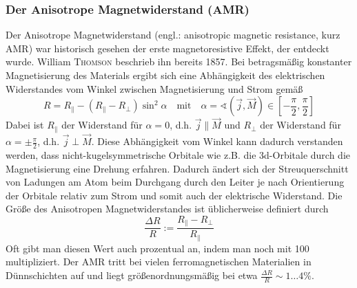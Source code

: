 \documentclass[german,  %
parskip=full,  %
]{scrartcl}
\begin{document}
\subsubsection{Der Anisotrope Magnetwiderstand (AMR)}
Der Anisotrope Magnetwiderstand (engl.: anisotropic magnetic resistance, kurz AMR) war historisch gesehen der erste magnetoresistive Effekt, der entdeckt wurde. William \textsc{Thomson} beschrieb ihn bereits 1857. Bei betragsmäßig konstanter Magnetisierung des Materials ergibt sich eine Abhängigkeit des elektrischen Widerstandes vom Winkel zwischen Magnetisierung und Strom gemäß
\[R = R_{\parallel} - (R_{\parallel} - R_{\perp})\sin^2\alpha\quad\text{mit}\quad \alpha = \sphericalangle (\vec{j},\vec{M})\in\left[-\frac{\pi}{2},\frac{\pi}{2}\right]\]
Dabei ist \(R_{\parallel}\) der Widerstand für \(\alpha=0\), d.h. \(\vec{j}\parallel\vec{M}\) und \(R_{\perp}\) der Widerstand für \(\alpha=\pm\frac{\pi}{2}\), d.h. \(\vec{j}\perp\vec{M}\).
Diese Abhängigkeit vom Winkel kann dadurch verstanden werden, dass nicht-kugelsymmetrische Orbitale wie z.B. die 3d-Orbitale durch die Magnetisierung eine Drehung erfahren. Dadurch ändert sich der Streuquerschnitt von Ladungen am Atom beim Durchgang durch den Leiter je nach Orientierung der Orbitale relativ zum Strom und somit auch der elektrische Widerstand. Die Größe des Anisotropen Magnetwiderstandes ist üblicherweise definiert durch
\[\frac{\Delta R}{R} := \frac{R_{\parallel} - R_{\perp}}{R_{\parallel}}\]
Oft gibt man diesen Wert auch prozentual an, indem man noch mit 100 multipliziert. Der AMR tritt bei vielen ferromagnetischen Materialien in Dünnschichten auf und liegt größenordnungsmäßig bei etwa \(\frac{\Delta R}{R} \sim 1\hdots 4\%\).
\end{document}
